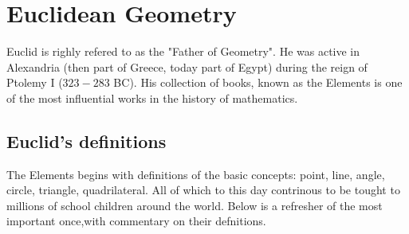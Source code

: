 \section{Euclidean Geometry}
Euclid is righly refered to as the "Father of Geometry". He was active in Alexandria (then part of Greece, today part of Egypt) during the reign of Ptolemy I ($323-283$ BC). His collection of books, known as the Elements is one of the most influential works in the history of mathematics.

\subsection{Euclid's definitions}
The Elements begins with definitions of the basic concepts: point, line, angle, circle, triangle, quadrilateral. All of which to this day contrinous to be tought to millions of school children around the world. Below is a refresher of the most important once,with commentary on their defnitions.

